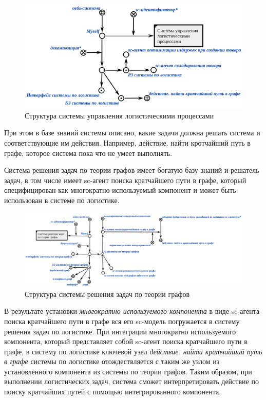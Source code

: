\begin{figure}[H]
	\includegraphics[scale=0.5]{author/part5/figures/logistics_system.png}
	\caption{Структура системы управления логистическими процессами}
	\label{fig:logistics_system}
\end{figure}

При этом в базе знаний системы описано, какие задачи должна решать система и соответствующие им действия. Например, действие. найти кротчайший путь в графе, которое система пока что не умеет выполнять.

Система решения задач по теории графов имеет богатую базу знаний и решатель задач, в том числе имеет sc-агент поиска кратчайшего пути в графе, который специфицирован как многократно используемый компонент и может быть использован в системе по логистике.

\begin{figure}[H]
	\includegraphics[scale=0.4]{author/part5/figures/graph_theory_system.png}
	\caption{Структура системы решения задач по теории графов}
	\label{fig:graph_theory_system}
\end{figure}

В результате установки \textit{многократно используемого компонента} в виде sc-агента поиска кратчайшего пути в графе вся его sc-модель погружается в систему решения задач по логистике. При интеграции многократно используемого компонента, который представляет собой sc-агент поиска кратчайшего пути в графе, в систему по логистике ключевой узел \textit{действие. найти кратчайший путь в графе} системы по логистике отождествляется с таким же узлом из установленного компонента из системы по теории графов. Таким образом, при выполнении логистических задач, система сможет интерпретировать действие по поиску кратчайших путей с помощью интегрированного компонента.


